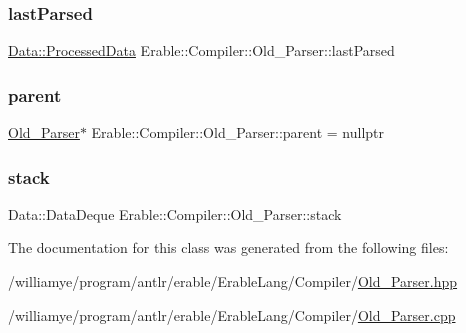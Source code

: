 \subsubsection{\texorpdfstring{lastParsed}{lastParsed}}
{\footnotesize\ttfamily \mbox{\hyperlink{struct_erable_1_1_compiler_1_1_data_1_1_processed_data}{Data\+::\+Processed\+Data}} Erable\+::\+Compiler\+::\+Old\+\_\+\+Parser\+::last\+Parsed\hspace{0.3cm}{\ttfamily [private]}}

\mbox{\label{class_erable_1_1_compiler_1_1_old___parser_a8295ed96c8f71b828024e97fe0da88aa}} 
\subsubsection{\texorpdfstring{parent}{parent}}
{\footnotesize\ttfamily \mbox{\hyperlink{class_erable_1_1_compiler_1_1_old___parser}{Old\+\_\+\+Parser}}$\ast$ Erable\+::\+Compiler\+::\+Old\+\_\+\+Parser\+::parent = nullptr\hspace{0.3cm}{\ttfamily [private]}}

\mbox{\label{class_erable_1_1_compiler_1_1_old___parser_aa739607e8e8a9aa93aba91a0719ca17e}} 
\subsubsection{\texorpdfstring{stack}{stack}}
{\footnotesize\ttfamily Data\+::\+Data\+Deque Erable\+::\+Compiler\+::\+Old\+\_\+\+Parser\+::stack\hspace{0.3cm}{\ttfamily [private]}}



The documentation for this class was generated from the following files\+:\begin{DoxyCompactItemize}
\item 
/williamye/program/antlr/erable/\+Erable\+Lang/\+Compiler/\mbox{\hyperlink{_old___parser_8hpp}{Old\+\_\+\+Parser.\+hpp}}\item 
/williamye/program/antlr/erable/\+Erable\+Lang/\+Compiler/\mbox{\hyperlink{_old___parser_8cpp}{Old\+\_\+\+Parser.\+cpp}}\end{DoxyCompactItemize}
